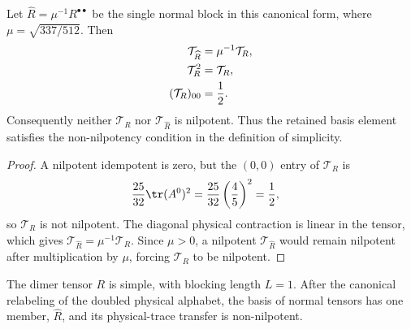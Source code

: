 \begin{lemma}%
    \label{thm:mpdo_bnt_label_rescaling_stable_non_nilpotent}
    \leanok
    Let $\widehat R=\mu^{-1}R^{\bullet\bullet}$ be the single normal
    block in this canonical form, where $\mu=\sqrt{337/512}$. Then
    \begin{align}
        \mathcal T_{\widehat R} & =\mu^{-1}\mathcal T_R,
        \notag                                           \\
        \mathcal T_R^2          & =\mathcal T_R,
        \notag                                           \\
        (\mathcal T_R)_{00}     & =\frac12.
        \notag
    \end{align}
    Consequently neither $\mathcal T_R$ nor
    $\mathcal T_{\widehat R}$ is nilpotent. Thus the retained basis element
    satisfies the non-nilpotency condition in the definition of simplicity.
\end{lemma}
\begin{proof}\leanok
    A nilpotent idempotent is zero, but the $(0,0)$ entry of
    $\mathcal T_R$ is
    \begin{align}
        \frac{25}{32}\tr(A^0)^2
         & =\frac{25}{32}\left(\frac45\right)^2
        =\frac12,
        \notag
    \end{align}
    so $\mathcal T_R$ is not nilpotent. The diagonal physical contraction is
    linear in the tensor, which gives
    $\mathcal T_{\widehat R}=\mu^{-1}\mathcal T_R$. Since $\mu>0$, a
    nilpotent $\mathcal T_{\widehat R}$ would remain nilpotent after
    multiplication by $\mu$, forcing $\mathcal T_R$ to be nilpotent.
\end{proof}

\begin{lemma}
    \label{thm:mpdo_bnt_label_rescaling_stable_simple}
    \leanok
    The dimer tensor $R$ is simple, with blocking length $L=1$.
    After the canonical relabeling of the doubled physical alphabet,
    the basis of normal tensors has one member, $\widehat R$, and its physical-trace
    transfer is non-nilpotent.
\end{lemma}

